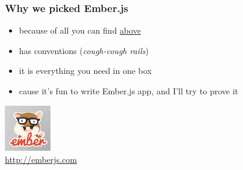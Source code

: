 \documentclass[compress]{beamer}
\begin{document}
\begin{frame}

\frametitle{Why we picked Ember.js}

\begin{itemize}[<+->]
  \item because of all you can find \hyperlink{why}{above \MoveUp}
  \item has conventions (\emph{cough-cough rails})
  \item it is everything you need in one box
  \item cause it's fun to write Ember.js app, and I'll try to prove it
\end{itemize}

\begin{flushright}
  \includegraphics[width=2cm]{emberjs.png}
  \\
  \tiny \url{http://emberjs.com}
\end{flushright}

\end{frame}
\end{document}
